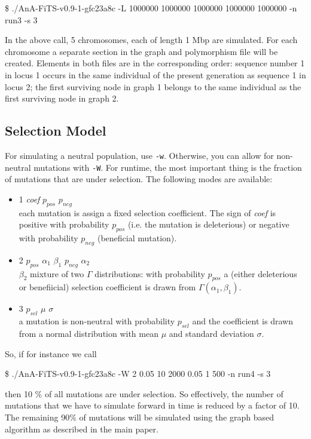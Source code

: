 \documentclass{scrartcl}
\begin{document}
\$ ./AnA-FiTS-v0.9-1-gfc23a8c -L 1000000 1000000 1000000 1000000 1000000   -n run3 -s 3

In the above call, 5 chromosomes, each of length 1 Mbp are
simulated. For each chromosome a separate section in the graph and
polymorphism file will be created. Elements in both files are in the
corresponding order: sequence number 1 in locus 1 occurs in the same
individual of the present generation as sequence 1 in locus 2; the
first surviving node in graph 1 belongs to the same individual as the
first surviving node in graph 2.

\subsection{Selection Model}
\label{sec:selection-model}

For simulating a neutral population, use \texttt{-w}. Otherwise, you
can allow for non-neutral mutations with \texttt{-W}. For runtime, the
most important thing is the fraction of mutations that are under
selection. The following modes are available: 

\begin{itemize}
\item 1 \textit{coef} $p_{pos}$ $p_{neg}$ \\
  each mutation is assign a fixed selection coefficient. The sign of
  \textit{coef} is positive with probability $p_{pos}$ (i.e. the
  mutation is deleterious) or negative with probability $p_{neg}$
  (beneficial mutation).
\item 2 $p_{pos}$ $\alpha_{1}$ $\beta_1$ $p_{neg}$ $\alpha_2$ \\
  $\beta_2$ mixture of two $\Gamma$ distributions: with probability
  $p_{pos}$ a (either deleterious or benefiicial) selection
  coefficient is drawn from $\Gamma(\alpha_1,\beta_1 )$.
\item 3  $p_{sel}$ $\mu$ $\sigma$ \\ 
  a mutation is non-neutral with probability $p_{sel}$ and the
  coefficient is drawn from a normal distribution with mean $\mu$ and
  standard deviation $\sigma$.
\end{itemize}

\noindent So, if for instance we call 

\$ ./AnA-FiTS-v0.9-1-gfc23a8c -W 2 0.05 10 2000 0.05 1 500 -n run4 -s 3

then 10 \% of all mutations are under selection. So effectively, the
number of mutations that we have to simulate forward in time is
reduced by a factor of 10. The remaining 90\% of mutations will be
simulated using the graph based algorithm as described in the main
paper. 
\end{document}
